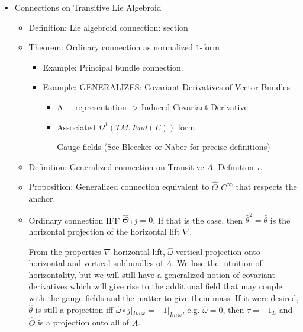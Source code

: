 {    \begin{itemize}
    
    \item Connections on Transitive Lie Algebroid
    
        \begin{itemize}
        
        \item Definition: Lie algebroid connection: section
        
        \item Theorem: Ordinary connection as normalized $1$-form
            
            \begin{itemize}
    
            \item Example: Principal bundle connection.
            
            \item Example: GENERALIZES: Covariant Derivatives of Vector Bundles
            
                \begin{itemize}
                    
                \item A + representation -> Induced Covariant Derivative
                
                \item Associated $\Omega^1(TM, End(E))$ form.
                
                Gauge fields (See Bleecker or Naber for precise definitions)
                    
                \end{itemize}
            
            \end{itemize}
        
        \item Definition: Generalized connection on Transitive $A$. Definition $\tau$.
        
        \item Proposition: Generalized connection equivalent to $\hat \Theta$ $C^\infty$ that respects the anchor. 
        
        \item Ordinary connection IFF $\hat \Theta \comp j = 0$. If that is the case, then $\hat \theta^2 = \hat \theta$ is the horizontal projection of the horizontal lift $\nabla$.
        
        From the properties $\nabla$ horizontal lift, $\hat \omega$ vertical projection onto horizontal and vertical subbundles of $A$. We lose the intuition of horizontality, but we will still have a generalized notion of covariant derivatives which will give rise to the additional field that may couple with the gauge fields and the matter to give them mass. If it were desired, $\hat \theta$ is still a projection iff $\hat \omega \circ j|_{Im \hat \,\omega} = - 1|_{Im \, \hat \omega}$, e.g. $\hat \omega = 0$, then $\tau = -1_L$ and $\hat \Theta$ is a projection onto all of $A$.
        

\end{itemize}
\end{itemize}}
